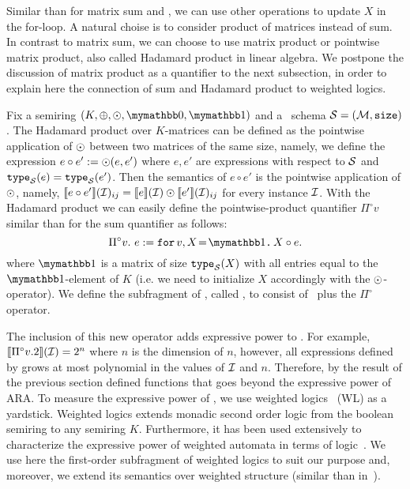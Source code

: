 
Similar than for matrix sum and \langsum, we can use other operations to update $X$ in the for-loop. A natural choise is to consider product of matrices instead of sum. In contrast to matrix sum, we can choose to use matrix product or pointwise matrix product, also called Hadamard product in linear algebra. We postpone the discussion of matrix product as a quantifier to the next subsection, in order to explain here the connection of sum and Hadamard product to weighted logics.

\newcommand{\hadprod}{\circ} 
\newcommand{\qhadprod}{\Pi^{\hadprod}} 

Fix a semiring $(K, \ksum, \kprod, \kzero, \kone)$ and a \lang\ schema  $\mathcal{S}=(\mathcal{M},\texttt{size})$. The Hadamard product over $K$-matrices can be defined as the pointwise application of $\odot$ between two matrices of the same size, namely, we define the expression $e \hadprod e' := \kprod (e, e')$ where $e, e'$ are expressions with respect to $\mathcal{S}$ and $\texttt{type}_{\mathcal{S}}(e) = \texttt{type}_{\mathcal{S}}(e')$. Then the semantics of $e \hadprod e'$ is the pointwise application of $\odot$, namely, $\sem{e \hadprod e'}{\I}_{ij} = \sem{e}{\I} \kprod \sem{e'}{\I}_{ij}$ for every instance $\mathcal{I}$. With the Hadamard product we can easily define the pointwise-product quantifier $\qhadprod v$ similar than for the sum quantifier as follows:
$$
\qhadprod v. \  e := \ffor{v}{X\!=\!\kone}{X \circ e}.
$$
where $\kone$ is a matrix of size $\texttt{type}_{\mathcal{S}}(X)$ with all entries equal to the $\kone$-element of $K$ (i.e. we need to initialize $X$ accordingly with the $\odot$-operator).
We define the subfragment of \langfor, called \langprod, to consist of \langsum \ plus the $\qhadprod$ operator.


The inclusion of this new operator adds expressive power to \langsum. For example,  $\sem{\qhadprod v. 2}{\cI} = 2^n$ where $n$ is the dimension of $n$, however, all expressions defined by \langsum grows at most polynomial in the values of $\mathcal{I}$ and $n$.  Therefore, by the result of the previous section \langprod defined functions that goes beyond the expressive power of ARA. To measure the expressive power of \langprod, we use weighted logics~\cite{DrosteG05} (WL) as a yardstick. Weighted logics extends monadic second order logic from the boolean semiring to any semiring $K$. Furthermore, it has been used extensively to characterize the expressive power of weighted automata in terms of logic~\cite{droste2009handbook}. We use here the first-order subfragment of weighted logics to suit our purpose and, moreover, we extend its semantics over weighted structure (similar than in~\cite{GradelV17}).

